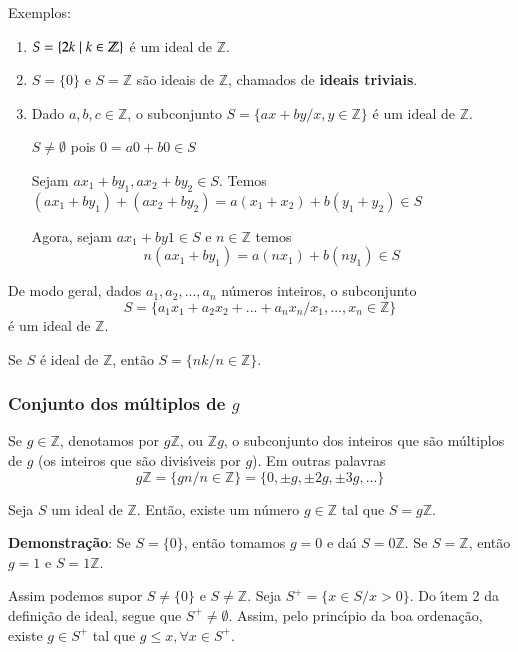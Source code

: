 Exemplos:
\begin{enumerate}
\item $S = \{2k \mid k \in \mathbb{Z}\}$ {\'e} um ideal de $\mathbb{Z}$.
\item $S=\{0\}$ e $S=\mathbb{Z}$ s{\~a}o ideais de $\mathbb{Z}$, chamados de \textbf{ideais triviais}.
\item Dado $a,b,c\in\mathbb{Z}$, o subconjunto $S=\{ax+by/x,y\in\mathbb{Z}\}$ {\'e} um ideal de $\mathbb{Z}$.

$S\neq\emptyset$ pois $0=a0+b0\in S$

Sejam $ax_{1}+by_{1},ax_{2}+by_{2}\in S$. Temos $(ax_{1}+by_{1})+(ax_{2}+by_{2})=a(x_{1}+x_{2})+b(y_{1}+y_{2})\in S$

Agora, sejam $ax_{1}+by{1}\in S$ e $n\in\mathbb{Z}$ temos \[n(ax_{1}+by_{1})=a(nx_{1})+b(ny_{1})\in S\]
\end{enumerate}

De modo geral, dados $a_{1},a_{2},...,a_{n}$ n{\'u}meros inteiros, o subconjunto \[S=\{a_{1}x_{1}+a_{2}x_{2}+...+a_{n}x_{n}/x_{1},...,x_{n}\in\mathbb{Z}\}\] {\'e} um ideal de $\mathbb{Z}$.

Se $S$ {\'e} ideal de $\mathbb{Z}$, ent{\~a}o $S=\{nk/n\in\mathbb{Z}\}$.
\subsubsection{Conjunto dos m{\'u}ltiplos de $g$}
\begin{nota} Se $g\in\mathbb{Z}$, denotamos por $g\mathbb{Z}$, ou $\mathbb{Z}g$, o subconjunto dos inteiros que s{\~a}o m{\'u}ltiplos de $g$ (os inteiros que s{\~a}o divis{\'\i}veis por $g$). Em outras palavras \[g\mathbb{Z}=\{gn/n\in\mathbb{Z}\}=\{0,\pm g,\pm 2g,\pm 3g,...\}\]
\end{nota}

\begin{teorema} Seja $S$ um ideal de $\mathbb{Z}$. Ent{\~a}o, existe um n{\'u}mero $g\in\mathbb{Z}$ tal que $S=g\mathbb{Z}$.\end{teorema}

\textbf{Demonstra{\c c}{\~a}o}: Se $S=\{0\}$, ent{\~a}o tomamos $g=0$ e da{\'\i} $S=0\mathbb{Z}$. Se $S=\mathbb{Z}$, ent{\~a}o $g=1$ e $S=1\mathbb{Z}$.

Assim podemos supor $S\neq\{0\}$ e $S\neq\mathbb{Z}$. Seja $S^{+}=\{x\in S/x>0\}$. Do {\'\i}tem 2 da defini{\c c}{\~a}o de ideal, segue que $S^{+}\neq\emptyset$. Assim, pelo princ{\'\i}pio da boa ordena{\c c}{\~a}o, existe $g\in S^{+}$ tal que $g\leq x,\forall x\in S^{+}$.

